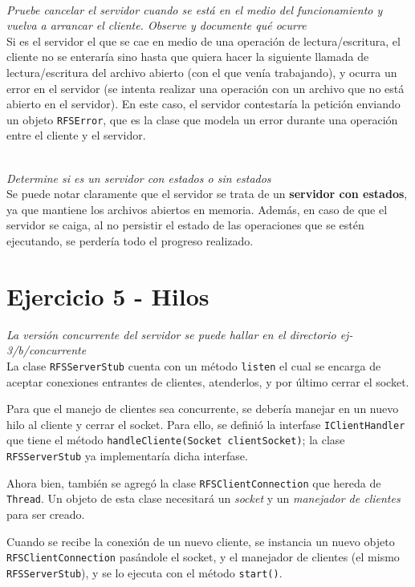 ~\\
\emph{Pruebe cancelar el servidor cuando se está en el medio del funcionamiento y vuelva a arrancar el cliente.  Observe y documente qué ocurre} 
~\\

Si es el servidor el que se cae en medio de una operación de lectura/escritura, el cliente no se enteraría sino hasta que quiera hacer la siguiente llamada de lectura/escritura del archivo abierto (con el que venía trabajando), y ocurra un error en el servidor (se intenta realizar una operación con un archivo que no está abierto en el servidor). En este caso, el servidor contestaría la petición enviando un objeto \texttt{RFSError}, que es la clase que modela un error durante una operación entre el cliente y el servidor. 

~\\
\emph{Determine si es un servidor con estados o sin estados} 
~\\

Se puede notar claramente que el servidor se trata de un \textbf{servidor con estados}, ya que mantiene los archivos abiertos en memoria. Además, en caso de que el servidor se caiga, al no persistir el estado de las operaciones que se estén ejecutando, se perdería todo el progreso realizado. 

\section{Ejercicio 5 - Hilos}

\emph{La versión concurrente del servidor se puede hallar en el directorio ej-3/b/concurrente} 
~\\

La clase \texttt{RFSServerStub} cuenta con un método \texttt{listen} el cual se encarga de aceptar conexiones entrantes de clientes, atenderlos, y por último cerrar el socket.

Para que el manejo de clientes sea concurrente, se debería manejar en un nuevo hilo al cliente y cerrar el socket. Para ello, se definió la interfase \texttt{IClientHandler} que tiene el método \texttt{handleCliente(Socket clientSocket)}; la clase \texttt{RFSServerStub} ya implementaría dicha interfase. 

Ahora bien, también se agregó la clase \texttt{RFSClientConnection} que hereda de \texttt{Thread}. Un objeto de esta clase necesitará un \emph{socket} y un \emph{manejador de clientes} para ser creado.   

Cuando se recibe la conexión de un nuevo cliente, se instancia un nuevo objeto \texttt{RFSClientConnection} pasándole el socket, y el manejador de clientes (el mismo \texttt{RFSServerStub}), y se lo ejecuta con el método \texttt{start()}.

